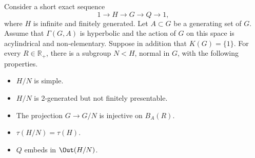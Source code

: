 \begin{theorem}
\label{thm:general}
Consider a short exact sequence
\begin{equation*}
1 \to H \to G \to Q \to 1,
\end{equation*}
where $H$ is infinite and finitely generated.
Let $A \subset G$ be a generating set of $G$.
Assume that $\Gamma(G,A)$ is hyperbolic and the action of $G$ on this space is acylindrical and non-elementary.
Suppose in addition that $K(G) = \{1\}$.
For every $R \in \mathbb R_+$, there is a subgroup $N < H$, normal in $G$, with the following properties.
\begin{itemize}
\item $H/N$ is simple.
\item $H/N$ is $2$-generated but not finitely presentable.
\item The projection $G \to G/N$ is injective on $B_A(R)$.
\item $\tau(H/N) = \tau(H)$.
\item $Q$ embeds in $\Out(H/N)$.
\end{itemize}
\end{theorem}

